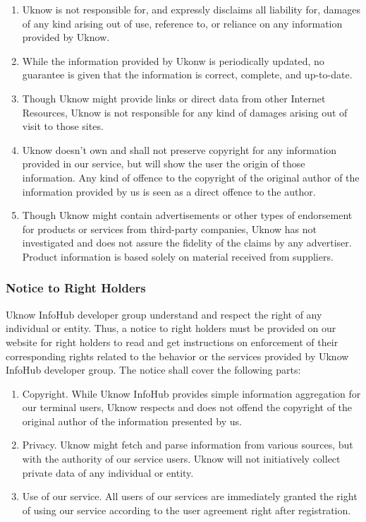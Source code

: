 \begin{enumerate}
\def\labelenumi{\arabic{enumi}.}
\item
  Uknow is not responsible for, and expressly disclaims all liability
  for, damages of any kind arising out of use, reference to, or reliance
  on any information provided by Uknow.
\item
  While the information provided by Ukonw is periodically updated, no
  guarantee is given that the information is correct, complete, and
  up-to-date.
\item
  Though Uknow might provide links or direct data from other Internet
  Resources, Uknow is not responsible for any kind of damages arising
  out of visit to those sites.
\item
  Uknow doesn't own and shall not preserve copyright for any information
  provided in our service, but will show the user the origin of those
  information. Any kind of offence to the copyright of the original
  author of the information provided by us is seen as a direct offence
  to the author.
\item
  Though Uknow might contain advertisements or other types of
  endorsement for products or services from third-party companies, Uknow
  has not investigated and does not assure the fidelity of the claims by
  any advertiser. Product information is based solely on material
  received from suppliers.
\end{enumerate}

\subsubsection{Notice to Right Holders}

Uknow InfoHub developer group understand and respect the right of any
individual or entity. Thus, a notice to right holders must be provided
on our website for right holders to read and get instructions on
enforcement of their corresponding rights related to the behavior or the
services provided by Uknow InfoHub developer group. The notice shall
cover the following parts:

\begin{enumerate}
\def\labelenumi{\arabic{enumi}.}
\item
  Copyright. While Uknow InfoHub provides simple information aggregation
  for our terminal users, Uknow respects and does not offend the
  copyright of the original author of the information presented by us.
\item
  Privacy. Uknow might fetch and parse information from various sources,
  but with the authority of our service users. Uknow will not
  initiatively collect private data of any individual or entity.
\item
  Use of our service. All users of our services are immediately granted
  the right of using our service according to the user agreement right
  after registration.
\end{enumerate}

